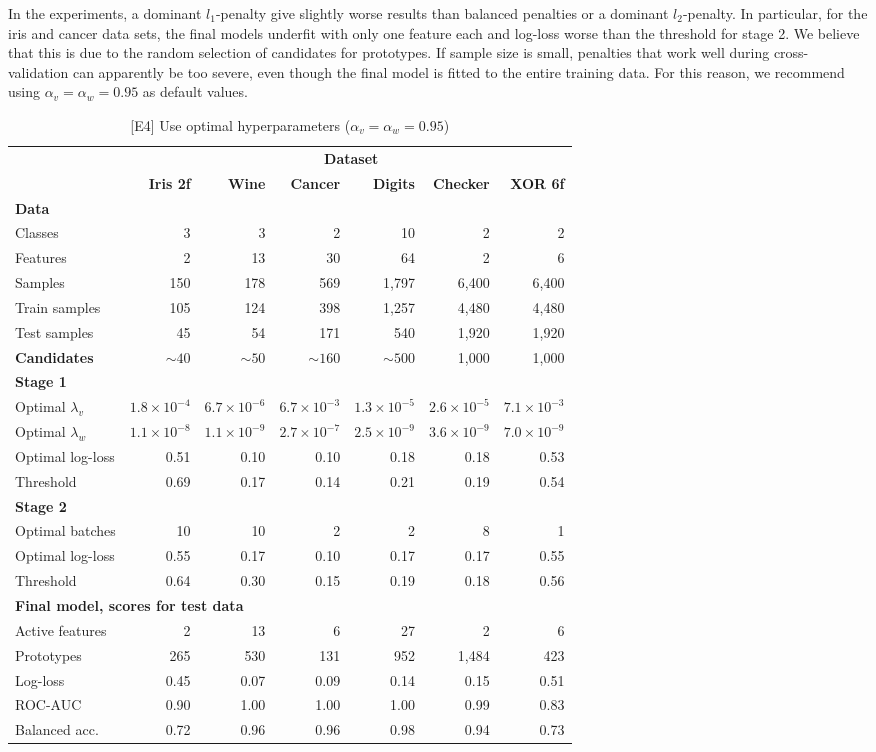 %
In the experiments, a dominant $l_1$-penalty give slightly worse results than balanced penalties or a dominant $l_2$-penalty.
In particular, for the iris and cancer data sets, the final models underfit with only one feature each and log-loss worse than the threshold for stage 2.
We believe that this is due to the random selection of candidates for prototypes.
If sample size is small, penalties that work well during cross-validation can apparently be too severe, even though the final model is fitted to the entire training data.
For this reason, we recommend using $\alpha_v=\alpha_w=0.95$ as default values.\par
%
\begin{table}
\caption{[E4] Use optimal hyperparameters ($\alpha_v=\alpha_w=0.95$)}
\label{tab_e4}
%
\begin{center}
\small
\begin{tabular}{|lrrrrrr|}
\hline
&\multicolumn{6}{c|}{\textbf{\hrulefill\ Dataset \hrulefill}}\\
&\textbf{Iris 2f}&\textbf{Wine}&\textbf{Cancer}&\textbf{Digits}&\textbf{Checker}&\textbf{XOR 6f}\\
\multicolumn{7}{|l|}{\textbf{Data}}\\
Classes&3&3&2&10&2&2\\
Features&2&13&30&64&2&6\\
Samples&150&178&569&1,797&6,400&6,400\\
Train samples&105&124&398&1,257&4,480&4,480\\
Test samples&45&54&171&540&1,920&1,920\\
\textbf{Candidates}&$\sim40$&$\sim50$&$\sim160$&$\sim500$&1,000&1,000\\
\multicolumn{7}{|l|}{\textbf{Stage 1}}\\
Optimal $\lambda_v$&$1.8\times10^{-4}$&$6.7\times10^{-6}$&$6.7\times10^{-3}$&$1.3\times10^{-5}$&$2.6\times10^{-5}$&$7.1\times10^{-3}$\\
Optimal $\lambda_w$&$1.1\times10^{-8}$&$1.1\times10^{-9}$&$2.7\times10^{-7}$&$2.5\times10^{-9}$&$3.6\times10^{-9}$&$7.0\times10^{-9}$\\
Optimal log-loss&0.51&0.10&0.10&0.18&0.18&0.53\\
Threshold&0.69&0.17&0.14&0.21&0.19&0.54\\
\multicolumn{7}{|l|}{\textbf{Stage 2}}\\
Optimal batches&10&10&2&2&8&1\\
Optimal log-loss&0.55&0.17&0.10&0.17&0.17&0.55\\
Threshold&0.64&0.30&0.15&0.19&0.18&0.56\\
\multicolumn{7}{|l|}{\textbf{Final model, scores for test data}}\\
Active features&2&13&6&27&2&6\\
Prototypes&265&530&131&952&1,484&423\\
Log-loss&0.45&0.07&0.09&0.14&0.15&0.51\\
ROC-AUC&0.90&1.00&1.00&1.00&0.99&0.83\\
Balanced acc.&0.72&0.96&0.96&0.98&0.94&0.73\\
\hline
\end{tabular}
\end{center}
\end{table}
